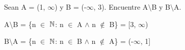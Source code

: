 \section{}
Sean A = (1, $\infty$) y B = (-$\infty$, 3). Encuentre A$\setminus$B y B$\setminus$A.\\

\begin{enumerate}{
\item A$\setminus$B = \{n $\in$ $\mathbb{N}$: n $\in$ A $\wedge$ n $\notin$ B\} = [3, $\infty$)
\item B$\setminus$A = \{n $\in$ $\mathbb{N}$: n $\in$ B $\wedge$ n $\notin$ A\} = (-$\infty$, 1]
}
\end{enumerate}
